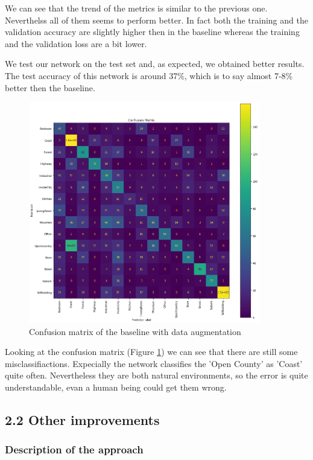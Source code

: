 \documentclass[12pt, a4paper]{report}
\begin{document}
We can see that the trend of the metrics is similar to the previous one. Neverthelss all of them seems to perform better. In fact both the training and the validation accuracy are slightly higher then in the baseline whereas the training and the validation loss are a bit lower. 

We test our network on the test set and, as expected, we obtained better results.\\
The test accuracy of this network is around 37\%, which is to say almost 7-8\% better then the baseline.

\begin{figure}[h!]
	\centering
	\includegraphics[width=0.9\textwidth]{img/aug_cmatrix}
	\caption{Confusion matrix of the baseline with data augmentation}
	\label{fig:augcmatrix}
\end{figure}

Looking at the confusion matrix (Figure \ref{fig:augcmatrix}) we can see that there are still some misclassifiactions. Expecially the network classifies the 'Open County' as 'Coast' quite often. Nevertheless they are both natural environments, so the error is quite understandable, evan a human being could get them wrong.

\subsection*{2.2 Other improvements}

\subsubsection*{Description of the approach}
\end{document}
